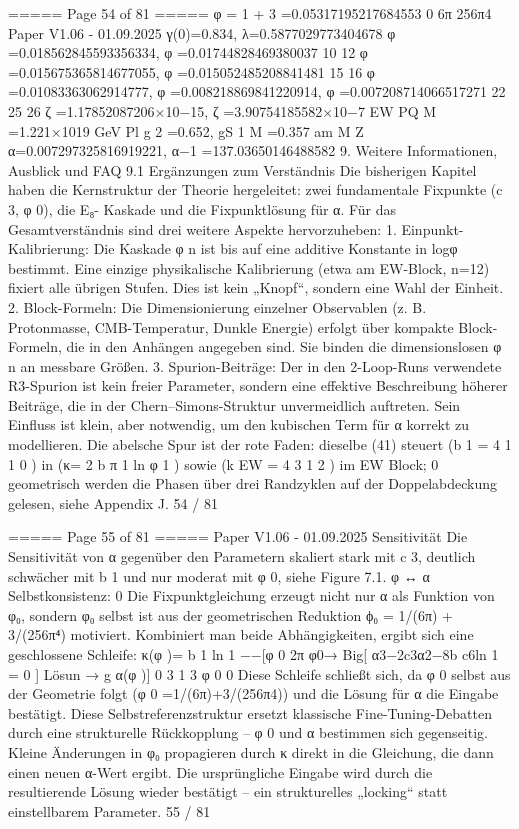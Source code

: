 \begin{MyVerbatim}
{{===== Page 54 of 81 =====
φ = 1 + 3 =0.05317195217684553
0 6π 256π4 Paper V1.06 - 01.09.2025
γ(0)=0.834, λ=0.5877029773404678
φ =0.018562845593356334, φ =0.01744828469380037
10 12
φ =0.015675365814677055, φ =0.015052485208841481
15 16
φ =0.01083363062914777, φ =0.008218869841220914, φ =0.007208714066517271
22 25 26
ζ =1.17852087206×10−15, ζ =3.90754185582×10−7
EW PQ
M =1.221×1019 GeV
Pl
g 2 =0.652, gS 1 M =0.357 am M Z
α=0.007297325816919221, α−1 =137.03650146488582
9. Weitere Informationen, Ausblick und FAQ
9.1 Ergänzungen zum Verständnis
Die bisherigen Kapitel haben die Kernstruktur der Theorie hergeleitet: zwei fundamentale Fixpunkte (c 3, φ 0), die E₈-
Kaskade und die Fixpunktlösung für α. Für das Gesamtverständnis sind drei weitere Aspekte hervorzuheben:
1. Einpunkt-Kalibrierung:
Die Kaskade φ n ist bis auf eine additive Konstante in logφ bestimmt. Eine einzige physikalische Kalibrierung (etwa
am EW-Block, n=12) fixiert alle übrigen Stufen. Dies ist kein „Knopf“, sondern eine Wahl der Einheit.
2. Block-Formeln:
Die Dimensionierung einzelner Observablen (z. B. Protonmasse, CMB-Temperatur, Dunkle Energie) erfolgt über
kompakte Block-Formeln, die in den Anhängen angegeben sind. Sie binden die dimensionslosen φ n an messbare
Größen.
3. Spurion-Beiträge:
Der in den 2-Loop-Runs verwendete R3-Spurion ist kein freier Parameter, sondern eine effektive Beschreibung
höherer Beiträge, die in der Chern–Simons-Struktur unvermeidlich auftreten. Sein Einfluss ist klein, aber notwendig,
um den kubischen Term für α korrekt zu modellieren.
Die abelsche Spur ist der rote Faden: dieselbe (41) steuert (b 1 = 4 1 1 0 ) in (κ= 2 b π 1 ln φ 1 ) sowie (k EW = 4 3 1 2 ) im EW Block;
0
geometrisch werden die Phasen über drei Randzyklen auf der Doppelabdeckung gelesen, siehe Appendix J.
54 / 81

===== Page 55 of 81 =====
Paper V1.06 - 01.09.2025
Sensitivität
Die Sensitivität von α gegenüber den Parametern skaliert stark mit c 3, deutlich schwächer mit b 1 und nur moderat mit
φ 0, siehe Figure 7.1.
φ ↔ α
Selbstkonsistenz:
0
Die Fixpunktgleichung erzeugt nicht nur α als Funktion von φ₀, sondern φ₀ selbst ist aus der geometrischen Reduktion ϕ₀
= 1/(6π) + 3/(256π⁴) motiviert. Kombiniert man beide Abhängigkeiten, ergibt sich eine geschlossene Schleife:
κ(φ )= b 1 ln 1
−−[φ 0 2π φ0→ Big[ α3−2c3α2−8b c6ln 1 = 0 ] Lösun → g α(φ )]
0 3 1 3 φ 0
0
Diese Schleife schließt sich, da φ 0 selbst aus der Geometrie folgt (φ 0 =1/(6π)+3/(256π4)) und die Lösung für α die
Eingabe bestätigt.
Diese Selbstreferenzstruktur ersetzt klassische Fine-Tuning-Debatten durch eine strukturelle Rückkopplung – φ 0 und α
bestimmen sich gegenseitig. Kleine Änderungen in φ₀ propagieren durch κ direkt in die Gleichung, die dann einen neuen
α-Wert ergibt. Die ursprüngliche Eingabe wird durch die resultierende Lösung wieder bestätigt – ein strukturelles „locking“
statt einstellbarem Parameter. 55 / 81

}}
\end{MyVerbatim}
